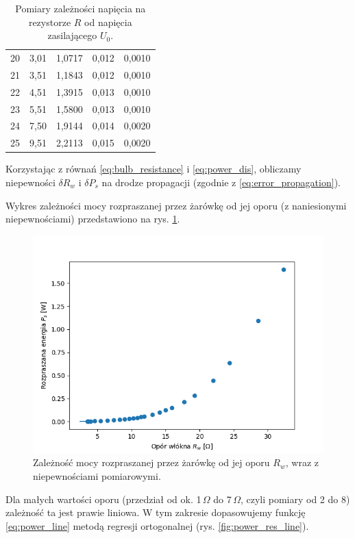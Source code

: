\documentclass[12pt]{article}
\begin{document}
\begin{table}[H]
\begin{tabular}{c|cccc}
        20 & 3{,}01  & 1{,}0717 & 0{,}012 & 0{,}0010  \\
        21 & 3{,}51  & 1{,}1843 & 0{,}012 & 0{,}0010  \\
        22 & 4{,}51  & 1{,}3915 & 0{,}013 & 0{,}0010  \\
        23 & 5{,}51  & 1{,}5800 & 0{,}013 & 0{,}0010  \\
        24 & 7{,}50  & 1{,}9144 & 0{,}014 & 0{,}0020  \\
        25 & 9{,}51  & 2{,}2113 & 0{,}015 & 0{,}0020  \\
        \bottomrule
    \end{tabular}
    \caption{Pomiary zależności napięcia na rezystorze $R$ od napięcia zasilającego $U_0$.}
    \label{tab:resistor_voltage}
\end{table}

Korzystając z równań \eqref{eq:bulb_resistance} i \eqref{eq:power_dis}, obliczamy niepewności $\delta R_w$ i $\delta P_s$ na drodze propagacji (zgodnie z \eqref{eq:error_propagation}).

\newpage

Wykres zależności mocy rozpraszanej przez żarówkę od jej oporu (z naniesionymi niepewnościami) przedstawiono na rys. \ref{fig:power_res_full}.
\begin{figure}[H]
    \centering
    \includegraphics[scale=0.58]{pomiary_moc}
    \caption{Zależność mocy rozpraszanej przez żarówkę od jej oporu $R_w$, wraz z niepewnościami pomiarowymi.}
    \label{fig:power_res_full}
\end{figure}

Dla małych wartości oporu (przedział od ok. 1\,\(\Omega\) do 7\,\(\Omega\), czyli pomiary od 2 do 8) zależność ta jest prawie liniowa. W tym zakresie dopasowujemy funkcję \eqref{eq:power_line} metodą regresji ortogonalnej (rys. \ref{fig:power_res_line}).
\end{document}
